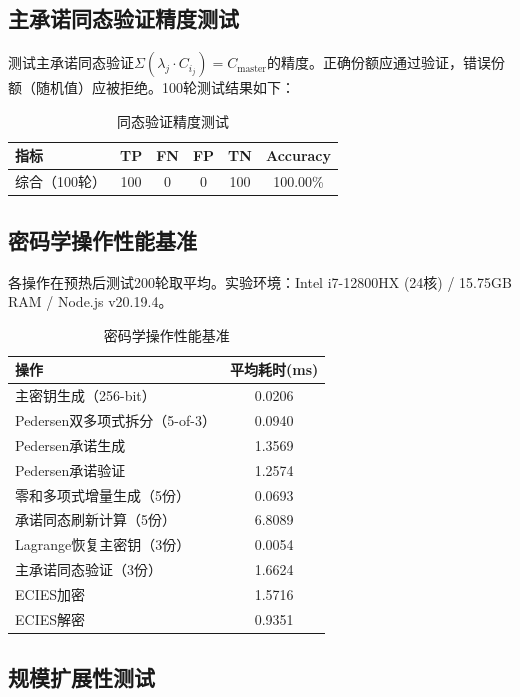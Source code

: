 \documentclass[UTF8,a4paper,zihao=-4,openany]{ctexrep}
\begin{document}
\subsection{主承诺同态验证精度测试}

测试主承诺同态验证$\Sigma(\lambda_j \cdot C_{i_j}) = C_{\text{master}}$的精度。正确份额应通过验证，错误份额（随机值）应被拒绝。100轮测试结果如下：

\begin{table}[htbp]
\centering
\caption{同态验证精度测试}
\label{tab:verify}
\begin{tabularx}{\textwidth}{lccccc}
\toprule
指标 & TP & FN & FP & TN & Accuracy\\
\midrule
综合（100轮） & 100 & 0 & 0 & 100 & 100.00\%\\
\bottomrule
\end{tabularx}
\end{table}

\subsection{密码学操作性能基准}

各操作在预热后测试200轮取平均。实验环境：Intel i7-12800HX (24核) / 15.75GB RAM / Node.js v20.19.4。

\begin{table}[htbp]
\centering
\caption{密码学操作性能基准}
\label{tab:perf_bench}
\begin{tabularx}{\textwidth}{lc}
\toprule
操作 & 平均耗时(ms)\\
\midrule
主密钥生成（256-bit） & 0.0206\\
Pedersen双多项式拆分（5-of-3） & 0.0940\\
Pedersen承诺生成 & 1.3569\\
Pedersen承诺验证 & 1.2574\\
零和多项式增量生成（5份） & 0.0693\\
承诺同态刷新计算（5份） & 6.8089\\
Lagrange恢复主密钥（3份） & 0.0054\\
主承诺同态验证（3份） & 1.6624\\
ECIES加密 & 1.5716\\
ECIES解密 & 0.9351\\
\bottomrule
\end{tabularx}
\end{table}

\subsection{规模扩展性测试}
\end{document}
